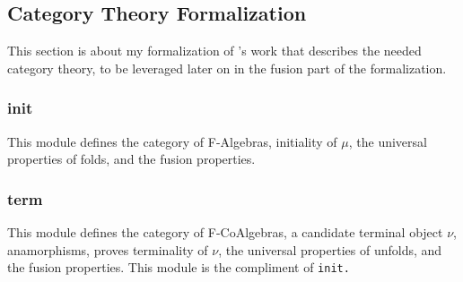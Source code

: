
\subsection{Category Theory Formalization}
This section is about my formalization of \cite{Harper2011}'s work that describes the needed category theory, to be leveraged later on in the fusion part of the formalization.
\subsubsection{init}
This module defines the category of F-Algebras, initiality of $\mu$, the universal properties of folds, and the fusion properties.



\subsubsection{term}
This module defines the category of F-CoAlgebras, a candidate terminal object $\nu$, anamorphisms, proves terminality of $\nu$, the universal properties of unfolds, and the fusion properties.
This module is the compliment of \tt{init}.

